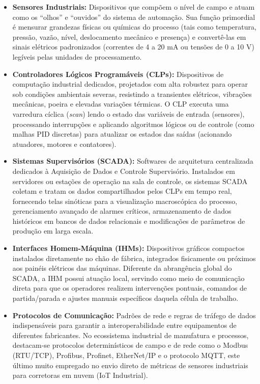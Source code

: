 \documentclass[12pt]{article}
\begin{document}
\begin{itemize}
    \item \textbf{Sensores Industriais:} Dispositivos que compõem o nível de campo e atuam como os ``olhos'' e ``ouvidos'' do sistema de automação. Sua função primordial é mensurar grandezas físicas ou químicas do processo (tais como temperatura, pressão, vazão, nível, deslocamento mecânico e presença) e convertê-las em sinais elétricos padronizados (correntes de 4 a 20 mA ou tensões de 0 a 10 V) legíveis pelas unidades de processamento.
    \item \textbf{Controladores Lógicos Programáveis (CLPs):} Dispositivos de computação industrial dedicados, projetados com alta robustez para operar sob condições ambientais severas, resistindo a transientes elétricos, vibrações mecânicas, poeira e elevadas variações térmicas. O CLP executa uma varredura cíclica (\textit{scan}) lendo o estado das variáveis de entrada (sensores), processando interrupções e aplicando algoritmos lógicos ou de controle (como malhas PID discretas) para atualizar os estados das saídas (acionando atuadores, motores e contatores).
    \item \textbf{Sistemas Supervisórios (SCADA):} Softwares de arquitetura centralizada dedicados à Aquisição de Dados e Controle Supervisório. Instalados em servidores ou estações de operação na sala de controle, os sistemas SCADA coletam e tratam os dados compartilhados pelos CLPs em tempo real, fornecendo telas sinóticas para a visualização macroscópica do processo, gerenciamento avançado de alarmes críticos, armazenamento de dados históricos em bancos de dados relacionais e modificações de parâmetros de produção em larga escala.
    \item \textbf{Interfaces Homem-Máquina (IHMs):} Dispositivos gráficos compactos instalados diretamente no chão de fábrica, integrados fisicamente ou próximos aos painéis elétricos das máquinas. Diferente da abrangência global do SCADA, a IHM possui atuação local, servindo como meio de comunicação direta para que os operadores realizem intervenções pontuais, comandos de partida/parada e ajustes manuais específicos daquela célula de trabalho.
    \item \textbf{Protocolos de Comunicação:} Padrões de rede e regras de tráfego de dados indispensáveis para garantir a interoperabilidade entre equipamentos de diferentes fabricantes. No ecossistema industrial de manufatura e processos, destacam-se protocolos determinísticos de campo e de rede como o Modbus (RTU/TCP), Profibus, Profinet, EtherNet/IP e o protocolo MQTT, este último muito empregado no envio direto de métricas de sensores industriais para corretoras em nuvem (IoT Industrial).
\end{itemize}
\end{document}
